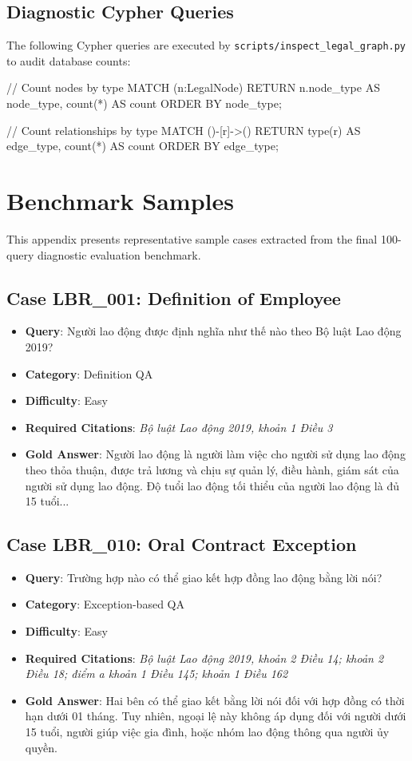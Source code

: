 \section{Diagnostic Cypher Queries}
The following Cypher queries are executed by \texttt{scripts/inspect\_legal\_graph.py} to audit database counts:
\begin{ThesisCode}
// Count nodes by type
MATCH (n:LegalNode)
RETURN n.node_type AS node_type, count(*) AS count
ORDER BY node_type;

// Count relationships by type
MATCH ()-[r]->()
RETURN type(r) AS edge_type, count(*) AS count
ORDER BY edge_type;
\end{ThesisCode}

\chapter{Benchmark Samples}
\label{app:benchmark-samples}

This appendix presents representative sample cases extracted from the final 100-query diagnostic evaluation benchmark.

\section{Case LBR\_001: Definition of Employee}
\begin{itemize}
  \item \textbf{Query}: Người lao động được định nghĩa như thế nào theo Bộ luật Lao động 2019?
  \item \textbf{Category}: Definition QA
  \item \textbf{Difficulty}: Easy
  \item \textbf{Required Citations}: \textit{Bộ luật Lao động 2019, khoản 1 Điều 3}
  \item \textbf{Gold Answer}: Người lao động là người làm việc cho người sử dụng lao động theo thỏa thuận, được trả lương và chịu sự quản lý, điều hành, giám sát của người sử dụng lao động. Độ tuổi lao động tối thiểu của người lao động là đủ 15 tuổi...
\end{itemize}

\section{Case LBR\_010: Oral Contract Exception}
\begin{itemize}
  \item \textbf{Query}: Trường hợp nào có thể giao kết hợp đồng lao động bằng lời nói?
  \item \textbf{Category}: Exception-based QA
  \item \textbf{Difficulty}: Easy
  \item \textbf{Required Citations}: \textit{Bộ luật Lao động 2019, khoản 2 Điều 14; khoản 2 Điều 18; điểm a khoản 1 Điều 145; khoản 1 Điều 162}
  \item \textbf{Gold Answer}: Hai bên có thể giao kết bằng lời nói đối với hợp đồng có thời hạn dưới 01 tháng. Tuy nhiên, ngoại lệ này không áp dụng đối với người dưới 15 tuổi, người giúp việc gia đình, hoặc nhóm lao động thông qua người ủy quyền.
\end{itemize}

